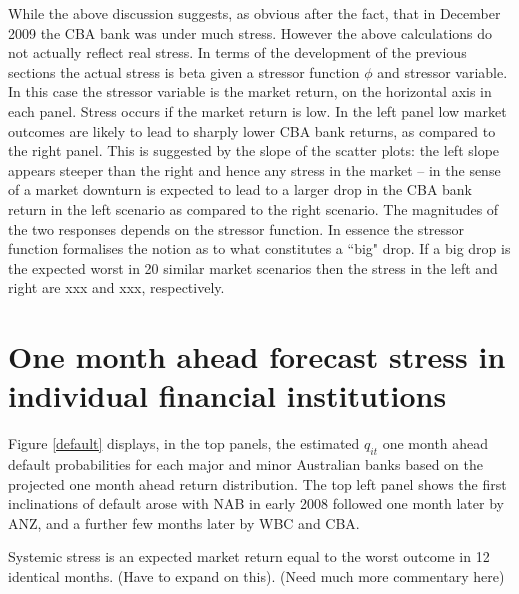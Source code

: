 \documentclass[authoryear]{elsarticle}
\newcommand{\fref}[1]{Figure \ref{#1}}
\begin{document}
 
While the above discussion suggests, as obvious after the fact, that in December 2009 the CBA bank was under much stress.   However the above calculations do not actually reflect real stress.   In terms of the development of the previous sections the actual stress is beta given a stressor function $\phi$ and stressor variable.   In this case the stressor variable is the market return, on the horizontal axis in each panel.   Stress occurs if the market return is low.   In the left panel low market outcomes are likely to lead to sharply lower CBA bank returns, as compared to the right panel.   This is suggested by the slope of the scatter plots:  the left slope appears steeper than the right and hence any stress in the market -- in the sense of a market downturn is expected to lead to a larger drop in the CBA bank return in the left scenario as compared to the right scenario.   The magnitudes of the two responses depends on the stressor function.   In essence the stressor function formalises the notion as to what constitutes a ``big" drop.   If a big drop is the expected worst in 20 similar market scenarios then the stress in the left and right are xxx and xxx, respectively.   


\section{One month ahead forecast stress in individual financial institutions}

\fref{default} displays, in the top panels, the estimated $q_{it}$ one month ahead default probabilities for each major and minor Australian banks based on the projected one month ahead return distribution.   The  top left panel shows the first inclinations of default arose with NAB in early 2008 followed one month later by ANZ, and  a further few months later by WBC and CBA. 


Systemic stress is an expected  market return equal to the worst outcome in 12 identical months.  (Have to expand on this).
(Need much more commentary here)
\end{document}
